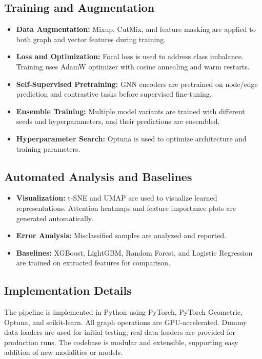 \documentclass[12pt]{article}
\begin{document}
\subsection{Training and Augmentation}
\begin{itemize}
    \item \textbf{Data Augmentation:} Mixup, CutMix, and feature masking are applied to both graph and vector features during training.
    \item \textbf{Loss and Optimization:} Focal loss is used to address class imbalance. Training uses AdamW optimizer with cosine annealing and warm restarts.
    \item \textbf{Self-Supervised Pretraining:} GNN encoders are pretrained on node/edge prediction and contrastive tasks before supervised fine-tuning.
    \item \textbf{Ensemble Training:} Multiple model variants are trained with different seeds and hyperparameters, and their predictions are ensembled.
    \item \textbf{Hyperparameter Search:} Optuna is used to optimize architecture and training parameters.
\end{itemize}

\subsection{Automated Analysis and Baselines}
\begin{itemize}
    \item \textbf{Visualization:} t-SNE and UMAP are used to visualize learned representations. Attention heatmaps and feature importance plots are generated automatically.
    \item \textbf{Error Analysis:} Misclassified samples are analyzed and reported.
    \item \textbf{Baselines:} XGBoost, LightGBM, Random Forest, and Logistic Regression are trained on extracted features for comparison.
\end{itemize}

\subsection{Implementation Details}
The pipeline is implemented in Python using PyTorch, PyTorch Geometric, Optuna, and scikit-learn. All graph operations are GPU-accelerated. Dummy data loaders are used for initial testing; real data loaders are provided for production runs. The codebase is modular and extensible, supporting easy addition of new modalities or models.
\end{document}
